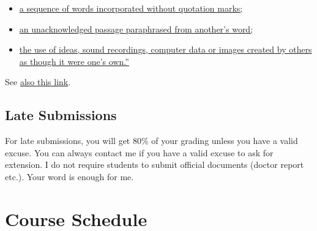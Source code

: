 \documentclass[
  letterpaper,
  DIV=11,
  numbers=noendperiod]{scrartcl}
\begin{document}
\begin{itemize}
\item
  \href{(https://www.nyu.edu/about/policies-guidelines-compliance/policies-and-guidelines/academic-integrity-for-students-at-nyu.html)}{a
  sequence of words incorporated without quotation marks;}
\item
  \href{(https://www.nyu.edu/about/policies-guidelines-compliance/policies-and-guidelines/academic-integrity-for-students-at-nyu.html)}{an
  unacknowledged passage paraphrased from another's word;}
\item
  \href{(https://www.nyu.edu/about/policies-guidelines-compliance/policies-and-guidelines/academic-integrity-for-students-at-nyu.html)}{the
  use of ideas, sound recordings, computer data or images created by
  others as though it were one's own.''}
\end{itemize}

See
\href{https://owl.purdue.edu/owl/research_and_citation/resources.html}{also
this link}.

\hypertarget{late-submissions}{%
\subsection{Late Submissions}\label{late-submissions}}

For late submissions, you will get 80\% of your grading unless you have
a valid excuse. You can always contact me if you have a valid excuse to
ask for extension. I do not require students to submit official
documents (doctor report etc.). Your word is enough for me.

\newpage{}

\hypertarget{course-schedule}{%
\section{\texorpdfstring{{Course
Schedule}}{Course Schedule}}\label{course-schedule}}
\end{document}
